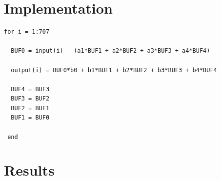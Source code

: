 \section{Implementation}


\begin{lstlisting}
for i = 1:707

  BUF0 = input(i) - (a1*BUF1 + a2*BUF2 + a3*BUF3 + a4*BUF4)
	
  output(i) = BUF0*b0 + b1*BUF1 + b2*BUF2 + b3*BUF3 + b4*BUF4
    	
  BUF4 = BUF3
  BUF3 = BUF2
  BUF2 = BUF1
  BUF1 = BUF0
    
 end
\end{lstlisting}

\section{Results}